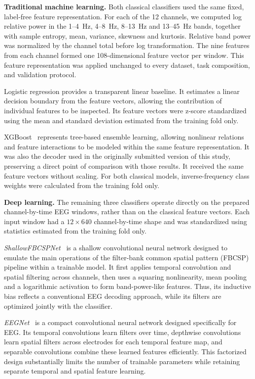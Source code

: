 \documentclass[10pt,letterpaper]{article}
\newcommand{\rev}[1]{#1}
\begin{document}
\textbf{Traditional machine learning.}
\rev{Both classical classifiers used the same fixed, label-free feature
representation. For each of the 12 channels, we computed log relative power in
the 1--4~Hz, 4--8~Hz, 8--13~Hz and 13--45~Hz bands, together with sample
entropy, mean, variance, skewness and kurtosis. Relative band power was
normalized by the channel total before log transformation. The nine features
from each channel formed one 108-dimensional feature vector per window.
This feature representation was applied unchanged to every dataset,
task composition, and validation protocol.}

\rev{Logistic regression provides a transparent linear baseline. It estimates
a linear decision boundary from the feature vectors, allowing the contribution
of individual features to be inspected. Its feature vectors were z-score
standardized using the mean and standard deviation estimated from the training
fold only.}

\rev{XGBoost~\cite{chen2016xgboost} represents tree-based ensemble learning,
allowing nonlinear relations and feature interactions to be modeled within the
same feature representation. It was also the decoder used in the originally
submitted version of this study, preserving a direct point of comparison with
those results. It received the same feature vectors without scaling. For both
classical models, inverse-frequency class weights were calculated from the
training fold only.}

\textbf{Deep learning.}
\rev{The remaining three classifiers operate directly on the prepared
channel-by-time EEG windows, rather than on the classical feature vectors. Each
input window had a $12 \times 640$ channel-by-time shape and was standardized
using statistics estimated from the training fold only.}

\rev{\textit{ShallowFBCSPNet}~\cite{schirrmeister2017deep} is a shallow
convolutional neural network designed to emulate the main operations of the
filter-bank common spatial pattern (FBCSP) pipeline within a trainable model.
It first applies temporal convolution and spatial filtering across channels,
then uses a squaring nonlinearity, mean pooling and a logarithmic activation to
form band-power-like features. Thus, its inductive bias reflects a conventional
EEG decoding approach, while its filters are optimized jointly with the
classifier.}

\rev{\textit{EEGNet}~\cite{lawhern2018eegnet} is a compact convolutional neural
network designed specifically for EEG. Its temporal convolutions learn filters
over time, depthwise convolutions learn spatial filters across electrodes for
each temporal feature map, and separable convolutions combine these learned
features efficiently. This factorized design substantially limits the number
of trainable parameters while retaining separate temporal and spatial feature
learning.}
\end{document}
